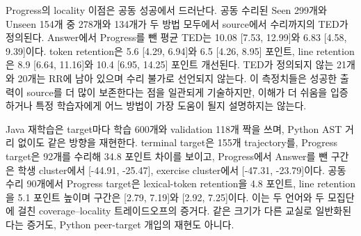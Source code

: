 \documentclass[10pt,conference]{IEEEtran}
\begin{document}
Progress의 locality 이점은 공동 성공에서 드러난다. 공동 수리된 Seen 299개와 Unseen 154개 중 278개와 134개가 두 방법 모두에서 source에서 수리까지의 TED가 정의된다. Answer에서 Progress를 뺀 평균 TED는 10.08 [7.53, 12.99]와 6.83 [4.58, 9.39]이다. token retention은 5.6 [4.29, 6.94]와 6.5 [4.26, 8.95] 포인트, line retention은 8.9 [6.64, 11.16]와 10.4 [6.95, 14.25] 포인트 개선된다. TED가 정의되지 않는 21개와 20개는 RR에 남아 있으며 수리 불가로 선언되지 않는다. 이 측정치들은 성공한 출력이 source를 더 많이 보존한다는 점을 일관되게 기술하지만, 이해가 더 쉬움을 입증하거나 특정 학습자에게 어느 방법이 가장 도움이 될지 설명하지는 않는다.

Java 재학습은 target마다 학습 600개와 validation 118개 짝을 쓰며, Python AST 거리 없이도 같은 방향을 재현한다. terminal target은 155개 trajectory를, Progress target은 92개를 수리해 34.8 포인트 차이를 보이고, Progress에서 Answer를 뺀 구간은 학생 cluster에서 [-44.91, -25.47], exercise cluster에서 [-47.31, -23.79]이다. 공동 수리 90개에서 Progress target은 lexical-token retention을 4.8 포인트, line retention을 5.1 포인트 높이며 구간은 [2.79, 7.19]와 [2.92, 7.25]이다. 이는 두 언어와 두 모집단에 걸친 coverage--locality 트레이드오프의 증거다. 같은 크기가 다른 교실로 일반화된다는 증거도, Python peer-target 개입의 재현도 아니다.
\end{document}
